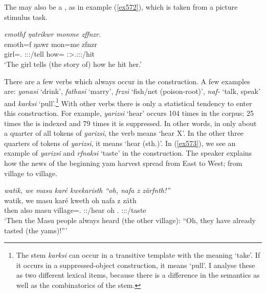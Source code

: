 The  may also be a , as in example (\ref{ex572}), which is taken from a picture stimulus task.

\begin{exe}
	\ex \emph{emothf ŋatrikwr monme zffnzr.}\\
	\gll emoth=f ŋawr mon=me zfnzr\\
	girl=\Erg.{\Sg} \Stsg:\Sbj:\Nonpast:\Ipfv/tell how={\Ins} \Stsg:\Sbj>\Tsg.\F:\Obj:\Rpst:\Ipfv/hit\\
	\trans `The girl tells (the story of) how he hit her.'
	\label{ex572}
\end{exe}

There are a few verbs which always occur in the  construction. A few examples are: \emph{yonasi} `drink', \emph{fathasi} `marry', \emph{frzsi} `fish/net (poison-root)', \emph{naf-} `talk, speak' and \emph{karksi} `pull'.\footnote{The stem \emph{karksi} can occur in a transitive template with the meaning `take'. If it occurs in a suppressed-object construction, it means `pull'. I analyse these as two different lexical items, because there is a difference in the semantics as well as the combinatorics of the stem.} With other verbs there is only a statistical tendency to enter this construction. For example, \emph{yarizsi} `hear' occurs 104 times in the corpus; 25 times the  is indexed and 79 times it is suppressed. In other words, in only about a quarter of all tokens of \emph{yarizsi}, the verb means `hear X'. In the other three quarters of tokens of \emph{yarizsi}, it means `hear (sth.)'. In (\ref{ex573}), we see an example of \emph{yarizsi} and \emph{rfnaksi} `taste' in the  construction. The speaker explains how the news of the beginning yam harvest spread from East to West; from village to village.

\begin{exe}
	\ex \emph{watik, we masu karé kwekaristh ``oh, nafa z zärfnth!''}\\
	\gll watik, we masu karé kweth oh nafa z zäth\\
	then also masu village=\Erg.{\Nsg} \Stpl:\Sbj:\Iter/hear oh \Stnsg.{\Erg} {\Iam} \Stpl:\Sbj:\Rpst:\Pfv/taste\\
	\trans `Then the Masu people always heard (the other village): ``Oh, they have already tasted (the yams)!'''
	\label{ex573}
\end{exe}

